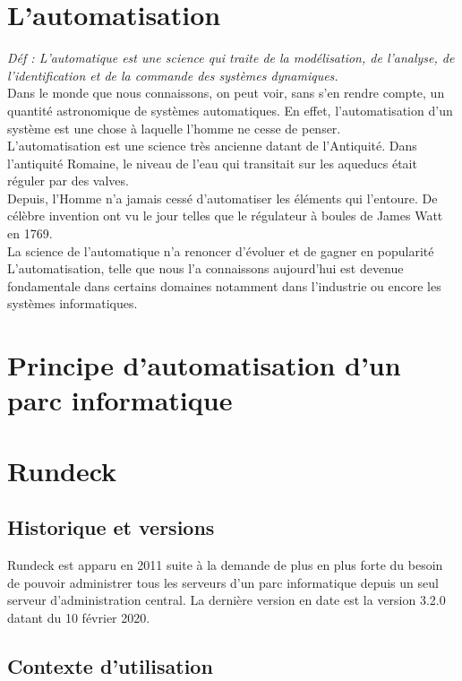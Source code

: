 \documentclass[12pt]{article}
\begin{document}
\section{L'automatisation}

\textit{Déf : L’automatique est une science qui traite de la modélisation, de l’analyse, de l’identification et de la commande des systèmes dynamiques.}
\vspace{0.5cm}
\\
Dans le monde que nous connaissons, on peut voir, sans s'en rendre compte, un quantité astronomique de systèmes automatiques. En effet, l'automatisation d'un système est une chose à laquelle l'homme ne cesse de penser. 
\\
L'automatisation est une science très ancienne datant de l'Antiquité. Dans l'antiquité Romaine, le  niveau de l'eau qui transitait sur les aqueducs était réguler par des valves.
\\
Depuis, l'Homme n'a jamais cessé d'automatiser les éléments qui l'entoure. De célèbre invention ont vu le jour telles que le régulateur à boules de James Watt en 1769.
\\
La science de l'automatique n'a renoncer d'évoluer et de gagner en popularité
\\
L'automatisation, telle que nous l'a connaissons aujourd'hui est devenue fondamentale dans certains domaines notamment dans l'industrie ou encore les systèmes informatiques.

\section{Principe d'automatisation d'un parc informatique}

\section{Rundeck}
\subsection{Historique et versions}

Rundeck est apparu en 2011 suite à la demande de plus en plus forte du besoin de pouvoir administrer tous les serveurs d'un parc informatique depuis un seul serveur d'administration central. La dernière version en date est la version 3.2.0 datant du 10 février 2020.

\subsection{Contexte d'utilisation}
\end{document}

